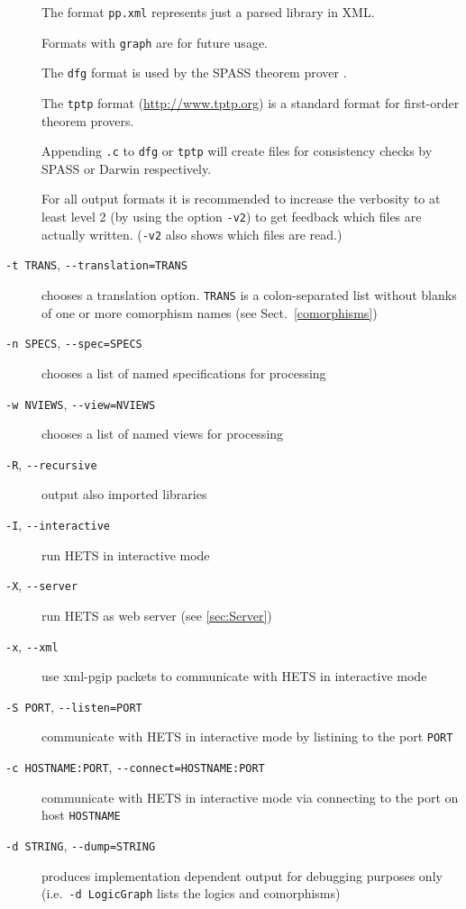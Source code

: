 \documentclass{article}
\newcommand{\normalTEXTSC}[2]{{#1\scriptsize#2}}
\newcommand     {\Hets}{\normalTEXTSC{H}{ETS}\xspace}
\newcommand     {\SPASS}{\normalTEXTSC{S}{PASS}\xspace}
\begin{document}
\begin{description}
The format \texttt{pp.xml} represents just a parsed library in XML.

Formats with \texttt{graph} are for future usage.

The \texttt{dfg} format is used by the \SPASS theorem prover
\cite{WeidenbachEtAl02}.

The \texttt{tptp} format (\url{http://www.tptp.org}) is a standard
format for first-order theorem provers.

Appending \texttt{.c} to \texttt{dfg} or \texttt{tptp} will create files for
consistency checks by SPASS or Darwin respectively.

For all output formats it is recommended to increase the verbosity to at least
level 2 (by using the option \texttt{-v2}) to get feedback which files are
actually written. (\texttt{-v2} also shows which files are read.)

\item[\texttt{-t TRANS}, \texttt{-{}-translation=TRANS}]
chooses a translation option. \texttt{TRANS} is a colon-separated list
without blanks of one or more comorphism names (see Sect.~\ref{comorphisms})

\item[\texttt{-n SPECS}, \texttt{-{}-spec=SPECS}]
chooses a list of named specifications for processing

\item[\texttt{-w NVIEWS}, \texttt{-{}-view=NVIEWS}]
chooses a list of named views for processing

\item[\texttt{-R}, \texttt{-{}-recursive}] output also imported libraries

\item[\texttt{-I}, \texttt{-{}-interactive}] run \Hets in interactive mode

\item[\texttt{-X}, \texttt{-{}-server}] run \Hets as web server (see
  \ref{sec:Server})

\item[\texttt{-x}, \texttt{-{}-xml}] use xml-pgip packets to communicate with
  \Hets in interactive mode

\item[\texttt{-S PORT}, \texttt{-{}-listen=PORT}] communicate
  with \Hets in interactive mode by listining to the port \texttt{PORT}

\item[\texttt{-c HOSTNAME:PORT}, \texttt{-{}-connect=HOSTNAME:PORT}] communicate
  with \Hets in interactive mode via connecting to the port on host
  \texttt{HOSTNAME}

\item[\texttt{-d STRING}, \texttt{-{}-dump=STRING}] produces implementation
  dependent output for debugging purposes only
  (i.e.\ \texttt{-d LogicGraph} lists the logics and comorphisms)
\end{description}
\end{document}
